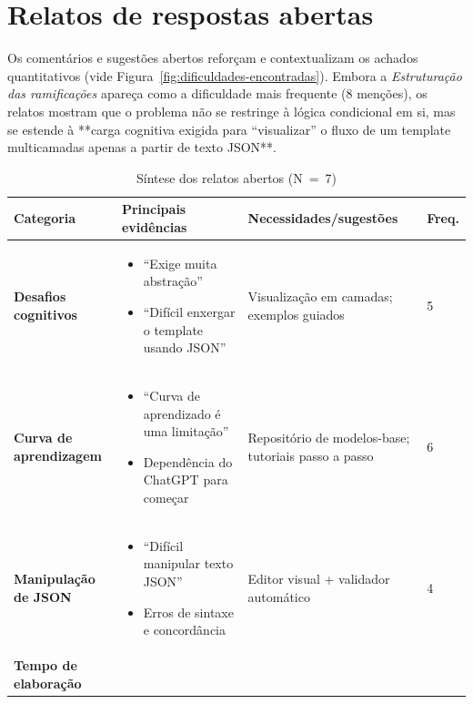 	
\section{Relatos de respostas abertas}


Os comentários e sugestões abertos reforçam e contextualizam os achados quantitativos (vide Figura~\ref{fig:dificuldades-encontradas}).  Embora a \textit{Estruturação das ramificações} apareça como a dificuldade mais frequente (8 menções), os relatos mostram que o problema não se restringe à lógica condicional em si, mas se estende à **carga cognitiva exigida para “visualizar” o fluxo de um template multicamadas apenas a partir de texto JSON**.

\begin{table}[H]
\centering
\caption{Síntese dos relatos abertos (N~=~7)}
\label{tab:relatos-abertos}
\begin{tabular}{p{} p{} p{} p{}}
\toprule
\textbf{Categoria} & \textbf{Principais evidências} & \textbf{Necessidades/sugestões} & \textbf{Freq.}\\ \midrule
\textbf{Desafios cognitivos} & \begin{itemize}[leftmargin=*]
    \item “Exige muita abstração” \newline
    \item “Difícil enxergar o template usando JSON”
\end{itemize} & Visualização em camadas; exemplos guiados & 5 \\ \midrule
\textbf{Curva de aprendizagem} & \begin{itemize}[leftmargin=*]
    \item “Curva de aprendizado é uma limitação” \newline
    \item Dependência do ChatGPT para começar
\end{itemize} & Repositório de modelos-base; tutoriais passo a passo & 6 \\ \midrule
\textbf{Manipulação de JSON} & \begin{itemize}[leftmargin=*]
    \item “Difícil manipular texto JSON” \newline
    \item Erros de sintaxe e concordância
\end{itemize} & Editor visual + validador automático & 4 \\ \midrule
\textbf{Tempo de elaboração} & \begin{itemize}[leftmargin=*]

\end{itemize}
\end{tabular}
\end{table}
